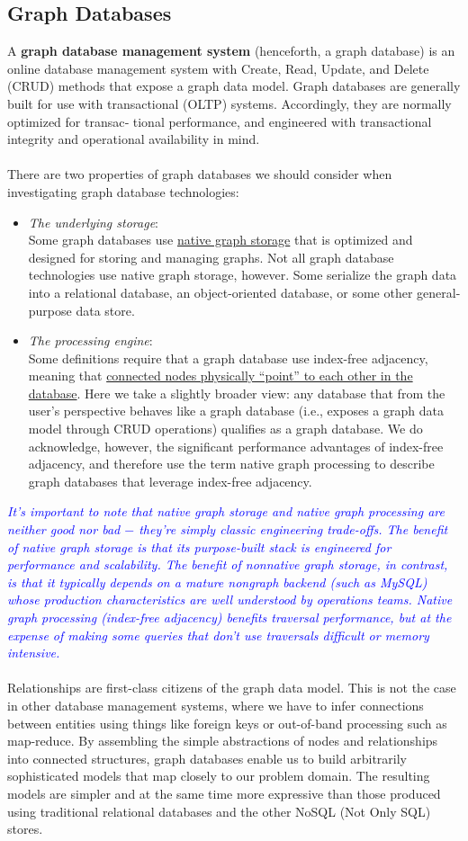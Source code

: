 \documentclass[10pt,a4paper]{article}
\newcommand{\nline}{\\~\\}
\begin{document}
\subsection{Graph Databases}
A \textbf{graph database management system} (henceforth, a graph database) is an online database management system with Create, Read, Update, and Delete (CRUD) methods that expose a graph data model. Graph databases are generally built for use with transactional (OLTP) systems. Accordingly, they are normally optimized for transac‐ tional performance, and engineered with transactional integrity and operational availability in mind. \nline
There are two properties of graph databases we should consider when investigating graph database technologies:
\begin{itemize}
	\item \textit{The underlying storage}: \\ Some graph databases use \uline{native graph storage} that is optimized and designed for storing and managing graphs. Not all graph database technologies use native graph storage, however. Some serialize the graph data into a relational database, an object-oriented database, or some other general-purpose data store.
	\item \textit{The processing engine}: \\ Some definitions require that a graph database use index-free adjacency, meaning that \uline{connected nodes physically “point” to each other in the database}. Here we take a slightly broader view: any database that from the user’s perspective behaves like a graph database (i.e., exposes a graph data model through CRUD operations) qualifies as a graph database. We do acknowledge, however, the significant performance advantages of index-free adjacency, and therefore use the term native graph processing to describe graph databases that leverage index-free adjacency.
\end{itemize}
\textcolor{blue}{\textit{It’s important to note that native graph storage and native graph processing are neither good nor bad $-$ they’re simply classic engineering trade-offs. The benefit of native graph storage is that its purpose-built stack is engineered for performance and scalability. The benefit of nonnative graph storage, in contrast, is that it typically depends on a mature nongraph backend (such as MySQL) whose production characteristics are well understood by operations teams. Native graph processing (index-free adjacency) benefits traversal performance, but at the expense of making some queries that don’t use traversals difficult or memory intensive.}} 
\nline
Relationships are first-class citizens of the graph data model. This is not the case in other database management systems, where we have to infer connections between entities using things like foreign keys or out-of-band processing such as map-reduce. By assembling the simple abstractions of nodes and relationships into connected structures, graph databases enable us to build arbitrarily sophisticated models that map closely to our problem domain. The resulting models are simpler and at the same time more expressive than those produced using traditional relational databases and the other NoSQL (Not Only SQL) stores.
\end{document}
